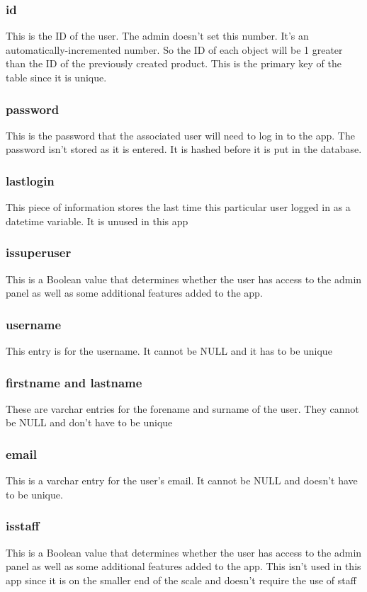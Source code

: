 \subsubsection{id}
This is the ID of the user. The admin doesn't set this number. It's an automatically-incremented number. So the ID of each object will be 1 greater than the ID of the previously created product. This is the primary key of the table since it is unique.
\subsubsection{password}
This is the password that the associated user will need to log in to the app. The password isn't stored as it is entered. It is hashed before it is put in the database.
\subsubsection{last\textunderscore login}
This piece of information stores the last time this particular user logged in as a datetime variable. It is unused in this app
\subsubsection{is\textunderscore superuser}
This is a Boolean value that determines whether the user has access to the admin panel as well as some additional features added to the app.
\subsubsection{username}
This entry is for the username. It cannot be NULL and it has to be unique
\subsubsection{first\textunderscore name and last\textunderscore name}
These are varchar entries for the forename and surname of the user. They cannot be NULL and don't have to be unique
\subsubsection{email}
This is a varchar entry for the user's email. It cannot be NULL and doesn't have to be unique.
\subsubsection{is\textunderscore staff}
This is a Boolean value that determines whether the user has access to the admin panel as well as some additional features added to the app. This isn't used in this app since it is on the smaller end of the scale and doesn't require the use of staff
